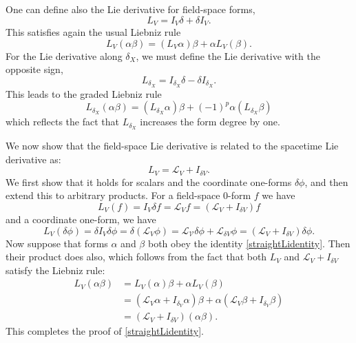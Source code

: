 \documentclass[a4paper,11pt]{article}
\begin{document}
One can define also the Lie derivative for field-space forms,
\begin{equation} \label{straightL}
L_V = I_V \delta + \delta I_V.
\end{equation}
This satisfies again the usual Liebniz rule
\begin{equation}
L_V(\alpha \beta) = (L_V \alpha) \beta + \alpha L_V(\beta).
\end{equation}
For the Lie derivative along $\delta_X$, we must define the Lie derivative with the opposite sign,
\begin{equation}
L_{\delta_X} = I_{\delta_X} \delta - \delta I_{\delta_X}.
\end{equation}
This leads to the graded Liebniz rule 
\begin{equation}
L_{\delta_X}(\alpha \beta) = (L_{\delta_X} \alpha) \beta + (-1)^p \alpha (L_{\delta_X} \beta)
\end{equation}
which reflects the fact that $L_{\delta_X}$ increases the form degree by one.

We now show that the field-space Lie derivative is related to the spacetime Lie derivative as:
\begin{equation} \label{straightLidentity}
L_V = \mathcal{L}_V + I_{\delta V}.
\end{equation}
We first show that it holds for scalars and the coordinate one-forms $\delta \phi$, and then extend this to arbitrary products.
For a field-space $0$-form $f$ we have
\begin{equation}
L_V(f) = I_V \delta f = \mathcal{L}_V f = (\mathcal{L}_V + I_{\delta V}) f
\end{equation}
and a coordinate one-form, we have
\begin{equation}
L_V(\delta \phi) = \delta I_V \delta \phi = \delta (\mathcal{L}_V \phi) = \mathcal{L_V} \delta \phi + \mathcal{L}_{\delta V} \phi = (\mathcal{L}_V + I_{\delta V}) \delta \phi.
\end{equation}
Now suppose that forms $\alpha$ and $\beta$ both obey the identity \eqref{straightLidentity}. 
Then their product does also, which follows from the fact that both $L_V$ and $\mathcal{L}_V + I_{\delta V}$ satisfy the Liebniz rule:
\begin{align}
L_V(\alpha \beta) &= L_V(\alpha) \beta + \alpha L_V(\beta) \nonumber \\
&= (\mathcal{L}_V \alpha + I_{\delta_V} \alpha) \beta + \alpha (\mathcal{L}_V \beta + I_{\delta_V} \beta) \nonumber \\
&= (\mathcal{L}_V + I_{\delta V})(\alpha \beta).
\end{align}
This completes the proof of \eqref{straightLidentity}.
\end{document}
